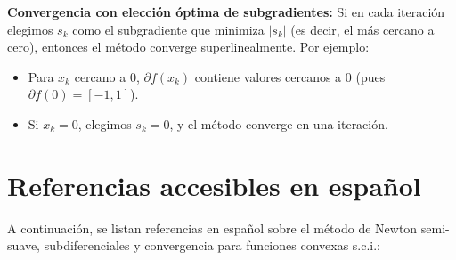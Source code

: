\documentclass[12pt]{book}
\theoremstyle{definition}
\theoremstyle{plain}
\theoremstyle{remark}
\begin{document}
\medskip
\textbf{Convergencia con elección óptima de subgradientes:}
Si en cada iteración elegimos \( s_k \) como el subgradiente que minimiza \( |s_k| \) (es decir, el más cercano a cero), entonces el método converge superlinealmente. Por ejemplo:
\begin{itemize}
    \item Para \( x_k \) cercano a \( 0 \), \( \partial f(x_k) \) contiene valores cercanos a \( 0 \) (pues \( \partial f(0) = [-1, 1] \)).
    \item Si \( x_k = 0 \), elegimos \( s_k = 0 \), y el método converge en una iteración.
\end{itemize}

\section*{Referencias accesibles en español}

A continuación, se listan referencias en español sobre el método de Newton semi-suave, subdiferenciales y convergencia para funciones convexas s.c.i.:
\end{document}
